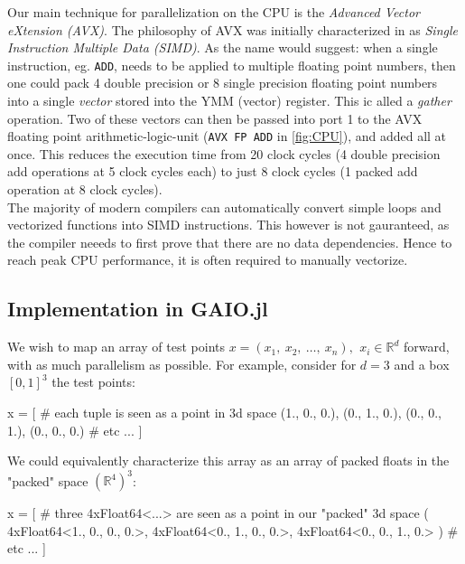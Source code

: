 Our main technique for parallelization on the CPU is the 
\emph{Advanced Vector eXtension (AVX)}. The philosophy of AVX was initially characterized 
in \cite*{simd} as \emph{Single Instruction Multiple Data (SIMD)}. As the name would 
suggest: when a single instruction, eg. \texttt{ADD}, needs to be applied to multiple 
floating point numbers, then one could pack 4 double precision or 8 single precision 
floating point numbers into a single \emph{vector} stored into the YMM (vector) register. 
This ic alled a \emph{gather} operation.
Two of these vectors can then be passed into port 1 to the AVX floating point 
arithmetic-logic-unit (\texttt{AVX FP ADD} in \autoref{fig:CPU}), and added all at once. 
This reduces the execution time from 20 clock cycles (4 double precision add operations at 
5 clock cycles each) to just 8 clock cycles (1 packed add operation at 8 clock cycles). \\

The majority of modern compilers can automatically convert simple loops and vectorized 
functions into SIMD instructions. This however is not gauranteed, as the compiler neeeds 
to first prove that there are no data dependencies. Hence to reach peak CPU performance, 
it is often required to manually vectorize. 


\subsection{Implementation in GAIO.jl}

We wish to map an array of test points 
$x = (x_1,\ x_2,\ \ldots,\ x_n),\,\ x_i \in \mathbb{R}^d$ forward, with as much 
parallelism as possible. For example, consider for $d=3$ and a box $[0,1]^3$ the test 
points:

\begin{jllisting}[language=julia, style=jlcodestyle]
    x = [   # each tuple is seen as a point in 3d space
        (1., 0., 0.),
        (0., 1., 0.),
        (0., 0., 1.),
        (0., 0., 0.)
        # etc ...
    ]
\end{jllisting}

We could equivalently characterize this array as an array of packed floats in 
the "packed" space $(\mathbb{R}^4)^3$:

\begin{jllisting}[language=julia, style=jlcodestyle]
    x = [   # three 4xFloat64<...> are seen as a point in our "packed" 3d space
        (
            4xFloat64<1., 0., 0., 0.>, 
            4xFloat64<0., 1., 0., 0.>, 
            4xFloat64<0., 0., 1., 0.>
        )
        # etc ...
    ]
\end{jllisting}

